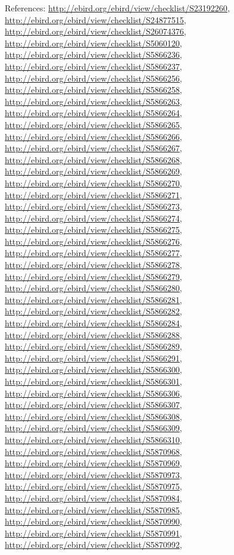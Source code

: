 \documentclass[9pt, article]{memoir}
\begin{document}
\begin{multicols}{2}
\vspace{6pt}References: 
\url{http://ebird.org/ebird/view/checklist/S23192260}, 
\url{http://ebird.org/ebird/view/checklist/S24877515}, 
\url{http://ebird.org/ebird/view/checklist/S26074376}, 
\url{http://ebird.org/ebird/view/checklist/S5060120}, 
\url{http://ebird.org/ebird/view/checklist/S5866236}, 
\url{http://ebird.org/ebird/view/checklist/S5866237}, 
\url{http://ebird.org/ebird/view/checklist/S5866256}, 
\url{http://ebird.org/ebird/view/checklist/S5866258}, 
\url{http://ebird.org/ebird/view/checklist/S5866263}, 
\url{http://ebird.org/ebird/view/checklist/S5866264}, 
\url{http://ebird.org/ebird/view/checklist/S5866265}, 
\url{http://ebird.org/ebird/view/checklist/S5866266}, 
\url{http://ebird.org/ebird/view/checklist/S5866267}, 
\url{http://ebird.org/ebird/view/checklist/S5866268}, 
\url{http://ebird.org/ebird/view/checklist/S5866269}, 
\url{http://ebird.org/ebird/view/checklist/S5866270}, 
\url{http://ebird.org/ebird/view/checklist/S5866271}, 
\url{http://ebird.org/ebird/view/checklist/S5866273}, 
\url{http://ebird.org/ebird/view/checklist/S5866274}, 
\url{http://ebird.org/ebird/view/checklist/S5866275}, 
\url{http://ebird.org/ebird/view/checklist/S5866276}, 
\url{http://ebird.org/ebird/view/checklist/S5866277}, 
\url{http://ebird.org/ebird/view/checklist/S5866278}, 
\url{http://ebird.org/ebird/view/checklist/S5866279}, 
\url{http://ebird.org/ebird/view/checklist/S5866280}, 
\url{http://ebird.org/ebird/view/checklist/S5866281}, 
\url{http://ebird.org/ebird/view/checklist/S5866282}, 
\url{http://ebird.org/ebird/view/checklist/S5866284}, 
\url{http://ebird.org/ebird/view/checklist/S5866288}, 
\url{http://ebird.org/ebird/view/checklist/S5866289}, 
\url{http://ebird.org/ebird/view/checklist/S5866291}, 
\url{http://ebird.org/ebird/view/checklist/S5866300}, 
\url{http://ebird.org/ebird/view/checklist/S5866301}, 
\url{http://ebird.org/ebird/view/checklist/S5866306}, 
\url{http://ebird.org/ebird/view/checklist/S5866307}, 
\url{http://ebird.org/ebird/view/checklist/S5866308}, 
\url{http://ebird.org/ebird/view/checklist/S5866309}, 
\url{http://ebird.org/ebird/view/checklist/S5866310}, 
\url{http://ebird.org/ebird/view/checklist/S5870968}, 
\url{http://ebird.org/ebird/view/checklist/S5870969}, 
\url{http://ebird.org/ebird/view/checklist/S5870973}, 
\url{http://ebird.org/ebird/view/checklist/S5870975}, 
\url{http://ebird.org/ebird/view/checklist/S5870984}, 
\url{http://ebird.org/ebird/view/checklist/S5870985}, 
\url{http://ebird.org/ebird/view/checklist/S5870990}, 
\url{http://ebird.org/ebird/view/checklist/S5870991}, 
\url{http://ebird.org/ebird/view/checklist/S5870992}, 

\end{multicols}
\end{document}
